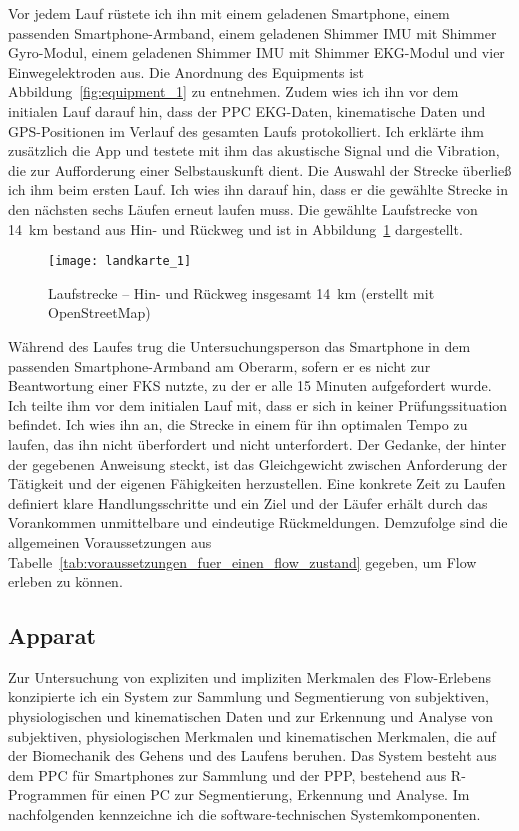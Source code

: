 Vor jedem Lauf rüstete ich ihn mit einem geladenen Smartphone, einem passenden Smartphone-Armband, einem geladenen Shimmer \ac{IMU} mit Shimmer Gyro-Modul, einem geladenen Shimmer \ac{IMU} mit Shimmer EKG-Modul und vier Einwegelektroden aus. Die Anordnung des Equipments ist Abbildung~\ref{fig:equipment_1} zu entnehmen. Zudem wies ich ihn vor dem initialen Lauf darauf hin, dass der \ac{PPC} \ac{EKG}-Daten, kinematische Daten und \ac{GPS}-Positionen im Verlauf des gesamten Laufs protokolliert. Ich erklärte ihm zusätzlich die App und testete mit ihm das akustische Signal und die Vibration, die zur Aufforderung einer Selbstauskunft dient. Die Auswahl der Strecke überließ ich ihm beim ersten Lauf. Ich wies ihn darauf hin, dass er die gewählte Strecke in den nächsten sechs Läufen erneut laufen muss. Die gewählte Laufstrecke von 14~km bestand aus Hin- und Rückweg und ist in Abbildung~\ref{fig:landkarte_1} dargestellt. 
\begin{figure}
	[!htb] \centering 
	\texttt{[image: landkarte\_1]} \caption[Laufstrecke -- Hin- und Rückweg]{Laufstrecke -- Hin- und Rückweg insgesamt 14~km (erstellt mit OpenStreetMap)} \label{fig:landkarte_1} 
\end{figure}

Während des Laufes trug die Untersuchungsperson das Smartphone in dem passenden Smartphone-Armband am Oberarm, sofern er es nicht zur Beantwortung einer \ac{FKS} nutzte, zu der er alle 15 Minuten aufgefordert wurde. Ich teilte ihm vor dem initialen Lauf mit, dass er sich in keiner Prüfungssituation befindet. Ich wies ihn an, die Strecke in einem für ihn optimalen Tempo zu laufen, das ihn nicht überfordert und nicht unterfordert. Der Gedanke, der hinter der gegebenen Anweisung steckt, ist das Gleichgewicht zwischen Anforderung der Tätigkeit und der eigenen Fähigkeiten herzustellen. Eine konkrete Zeit zu Laufen definiert klare Handlungsschritte und ein Ziel und der Läufer erhält durch das Vorankommen unmittelbare und eindeutige Rückmeldungen. Demzufolge sind die allgemeinen Voraussetzungen aus Tabelle~\ref{tab:voraussetzungen_fuer_einen_flow_zustand} gegeben, um Flow erleben zu können. 

\subsection{Apparat} 

\label{sub:apparat_5_1}

Zur Untersuchung von expliziten und impliziten Merkmalen des Flow-Erlebens konzipierte ich ein System zur Sammlung und Segmentierung von subjektiven, physiologischen und kinematischen Daten und zur Erkennung und Analyse von subjektiven, physiologischen Merkmalen und kinematischen Merkmalen, die auf der Biomechanik des Gehens und des Laufens beruhen. Das System besteht aus dem \ac{PPC} für Smartphones zur Sammlung und der \ac{PPP}, bestehend aus R-Programmen für einen PC zur Segmentierung, Erkennung und Analyse. Im nachfolgenden kennzeichne ich die software-technischen Systemkomponenten.

